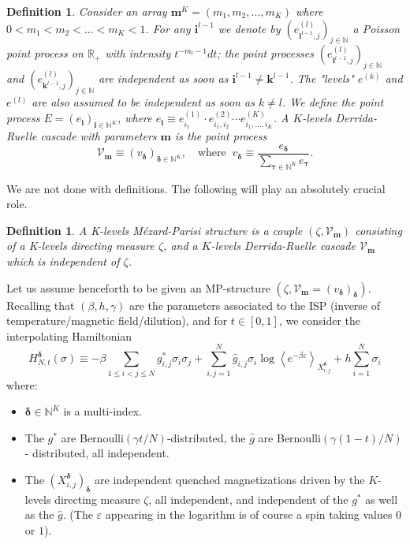 \documentclass[a4paper,12pt,oneside,reqno]{amsart}
\numberwithin{equation}{section}
\newtheorem{Def}[teor]{Definition}
\begin{document}
\begin{Def} Consider an array ${\boldsymbol m}^K = \left( m_1, m_2, \dots, m_K \right)$ where $0 < m_1 < m_2 <\dots < m_K < 1$. For  any ${\boldsymbol i}^{l-1}$  we denote by $(e^{(l)}_{{\boldsymbol i^{l-1}, j} })_{j \in {\mathbb{N}}}$ a Poisson point process on ${\mathbb{R}}_+$ with intensity $t^{-m_l -1} dt$; the point processes $(e^{(l)}_{{\boldsymbol i^{l-1}, j} })_{j \in {\mathbb{N}}}$ and $(e^{(l)}_{{\boldsymbol k^{l-1}, j} })_{j \in {\mathbb{N}}}$ are independent as soon as $\boldsymbol i^{l-1}
\neq \boldsymbol k^{l-1}$. The "levels" $e^{(k)}$ and $e^{(l)}$ are also assumed to be independent as soon as $k\neq l$. We define the point process
$E = \left( e_{\boldsymbol i} \right)_{\boldsymbol i \in {\mathbb{N}}^K}$, where $e_{\boldsymbol i} {\equiv} e^{(1)}_{i_1}\cdot e^{(2)}_{i_1, i_2}\cdots e^{(K)}_{i_1, \dots, i_K}$.
A $K$-levels \emph{Derrida-Ruelle cascade} with parameters $\boldsymbol m$ is the point process 
\[
\mathcal V_{\boldsymbol m} {\equiv} \left( v_{\boldsymbol \delta} \right)_{\boldsymbol \delta \in {\mathbb{N}}^K}, \quad \text{where}\;\; v_{\boldsymbol \delta} {\equiv} \frac{e_{\boldsymbol \delta}}{\sum_{\boldsymbol \tau \in {\mathbb{N}}^K} e_{\boldsymbol \tau}}.
\]
\end{Def}
We are not done with definitions. The following will play an absolutely crucial role. 
\begin{Def}
A K-levels \emph{M\'{e}zard-Parisi structure} is a couple $(\zeta, \mathcal V_{\boldsymbol m})$ consisting  of a K-levels directing measure $\zeta$, and a $K$-levels Derrida-Ruelle cascade $\mathcal V_{\boldsymbol m}$ which is independent of $\zeta$.
\end{Def}
\vspace{0.4cm}
Let us assume henceforth to be given an MP-structure $(\zeta, \mathcal V_{\boldsymbol m} = (v_{\boldsymbol \delta})_{\boldsymbol \delta})$. Recalling that $({\beta}, h, \gamma)$ are the parameters associated to the ISP (inverse of temperature/magnetic field/dilution), and for $t \in [0,1]$, we consider the interpolating Hamiltonian
\[
H^{\boldsymbol \delta}_{N,t}(\sigma) {\equiv} -\beta \sum\limits_{1\leq i<j \leq N} g^*_{i,j} \sigma_i \sigma_j + \sum\limits_{i,j=1}^N \hat{g}_{i,j} \sigma_i \log \left<e^{-\beta\varepsilon}\right>_{X^{\boldsymbol {\delta}}_{i,j}}+ h\sum\limits_{i=1}^N \sigma_i 
\]
where:
\begin{itemize}
\item $\boldsymbol \delta \in {\mathbb{N}}^K$ is a multi-index.
\item The $g^*$ are Bernoulli$(\gamma t/N)$-distributed, the $\hat{g}$ are Bernoulli$\left(\gamma (1-t)/N\right)$- distributed, all independent. 
\item The $(X^{\boldsymbol \delta}_{i,j})_{\boldsymbol \delta}$ are independent quenched magnetizations driven by the $K$-levels directing measure $\zeta$, all independent, and independent of the $g^*$ as well as the $\hat g$. (The ${\varepsilon}$ appearing in the logarithm is of course a spin taking values $0$ or $1$).
\end{itemize}
\end{document}
